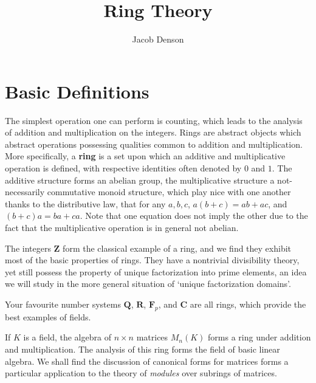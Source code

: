 

\title{Ring Theory}
\author{Jacob Denson}



\maketitle
\tableofcontents

\chapter{Basic Definitions}


The simplest operation one can perform is counting, which leads to the analysis of addition and multiplication on the integers. Rings are abstract objects which abstract operations possessing qualities common to addition and multiplication. More specifically, a {\bf ring} is a set upon which an additive and multiplicative operation is defined, with respective identities often denoted by $0$ and $1$. The additive structure forms an abelian group, the multiplicative structure a not-necessarily commutative monoid structure, which play nice with one another thanks to the distributive law, that for any $a,b,c$, $a(b+c) = ab + ac$, and $(b+c)a = ba + ca$. Note that one equation does not imply the other due to the fact that the multiplicative operation is in general not abelian.

\begin{example}
    The integers $\mathbf{Z}$ form the classical example of a ring, and we find they exhibit most of the basic properties of rings. They have a nontrivial divisibility theory, yet still possess the property of unique factorization into prime elements, an idea we will study in the more general situation of `unique factorization domains'.
\end{example}

\begin{example}
    Your favourite number systems $\mathbf{Q}$, $\mathbf{R}$, $\mathbf{F}_p$, and $\mathbf{C}$ are all rings, which provide the best examples of fields.
\end{example}

\begin{example}
    If $K$ is a field, the algebra of $n \times n$ matrices $M_n(K)$ forms a ring under addition and multiplication. The analysis of this ring forms the field of basic linear algebra. We shall find the discussion of canonical forms for matrices forms a particular application to the theory of {\it modules} over subrings of matrices.
\end{example}

